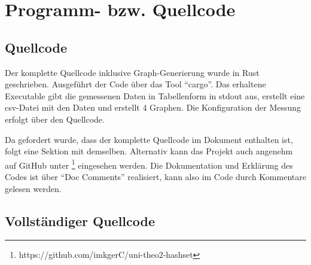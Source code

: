 \chapter{Programm- bzw. Quellcode}
\section{Quellcode}
Der komplette Quellcode inklusive Graph-Generierung wurde in Rust geschrieben. Ausgeführt der Code über das Tool \enquote{cargo}. Das erhaltene Executable gibt die gemessenen Daten in Tabellenform in stdout aus, erstellt eine csv-Datei mit den Daten und erstellt 4 Graphen. Die Konfiguration der Messung erfolgt über den Quellcode.

Da gefordert wurde, dass der komplette Quellcode im Dokument enthalten ist, folgt eine Sektion mit demselben. Alternativ kann das Projekt auch angenehm auf GitHub unter \footnote{https://github.com/imkgerC/uni-theo2-hashset} eingesehen werden. Die Dokumentation und Erklärung des Codes ist über \enquote{Doc Comments} realisiert, kann also im Code durch Kommentare gelesen werden.
\section{Vollständiger Quellcode}









